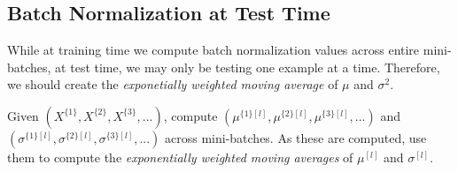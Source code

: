 \documentclass{article}
\begin{document}
\subsection{Batch Normalization at Test Time}

While at training time we compute batch normalization values across entire mini-batches, at test time, we may only be testing one example at a time.  Therefore, we should create the \textit{exponetially weighted moving average} of $\mu$ and $\sigma^2$.

Given $(X^{\{1\}}, X^{\{2\}}, X^{\{3\}}, ...)$, compute $(\mu^{\{1\}[l]}, \mu^{\{2\}[l]}, \mu^{\{3\}[l]}, ...)$ and $(\sigma^{\{1\}[l]}, \sigma^{\{2\}[l]}, \sigma^{\{3\}[l]}, ...)$ across mini-batches.  As these are computed, use them to compute the \textit{exponentially weighted moving averages} of $\mu^{[l]}$ and $\sigma^{[l]}$.
\end{document}
